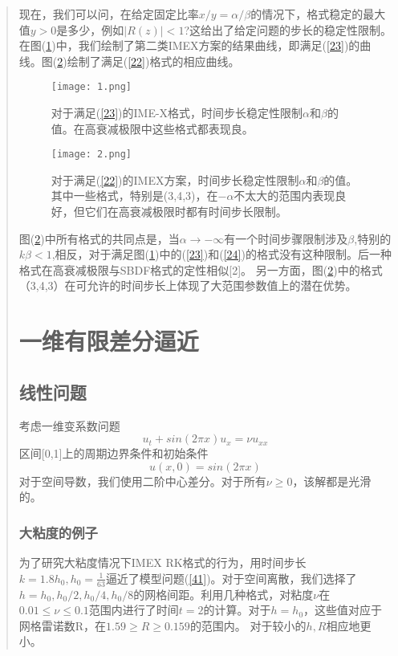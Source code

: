 \documentclass{article}
\begin{document}
\begin{CJK}{UTF8}{gkai}
\begin{quotation}
现在，我们可以问，在给定固定比率$x/y=\alpha/\beta$的情况下，格式稳定的最大值$y> 0$是多少，例如$|R(z)|<1$?这给出了给定问题的步长的稳定性限制。在图(\ref{figures1})中，我们绘制了第二类IMEX方案的结果曲线，即满足(\ref{23})的曲线。图(\ref{figures2})绘制了满足(\ref{22})格式的相应曲线。

\begin{figure}[H]
\texttt{[image: 1.png]}
\caption{对于满足(\ref{23})的IME-X格式，时间步长稳定性限制$\alpha$和$\beta$的值。在高衰减极限中这些格式都表现良。}
\centering
\label{figures1}
\end{figure}
\begin{figure}[H]
\texttt{[image: 2.png]}
\caption{对于满足(\ref{22})的IMEX方案，时间步长稳定性限制$\alpha$和$\beta$的值。其中一些格式，特别是(3,4,3)，在$-\alpha$不太大的范围内表现良好，但它们在高衰减极限时都有时间步长限制。}
\centering
\label{figures2}
\end{figure}

图(\ref{figures2})中所有格式的共同点是，当$\alpha\to -\infty$有一个时间步骤限制涉及$\beta$,特别的$k\beta<1$,相反，对于满足图(\ref{figures1})中的(\ref{23})和(\ref{24})的格式没有这种限制。后一种格式在高衰减极限与SBDF格式的定性相似[2]。 另一方面，图(\ref{figures2})中的格式（3,4,3）在可允许的时间步长上体现了大范围参数值上的潜在优势。

\section{一维有限差分逼近}
\subsection{线性问题}

考虑一维变系数问题
\begin{equation}
u_{t}+sin(2\pi x)u_{x}=\nu u_{xx}
\label{41}
\end{equation}
区间[0,1]上的周期边界条件和初始条件
\begin{equation*}
u(x,0)=sin(2\pi x)
\end{equation*}
对于空间导数，我们使用二阶中心差分。对于所有$\nu\ge 0$，该解都是光滑的。

\subsubsection{大粘度的例子}

为了研究大粘度情况下IMEX RK格式的行为，用时间步长$k=1.8h_{0},h_{0}=\frac{1}{63}$逼近了模型问题(\ref{41})。对于空间离散，我们选择了$h=h_{0},h_{0}/2,h_{0}/4,h_{0}/8$的网格间距。利用几种格式，对粘度$\nu$在$0.01\le \nu\le 0.1$范围内进行了时间$t=2$的计算。对于$h=h_{0}$，这些值对应于网格雷诺数R，在$1.59\ge R\ge 0.159$的范围内。 对于较小的$h,R$相应地更小。


\end{quotation}
\end{CJK}
\end{document}
